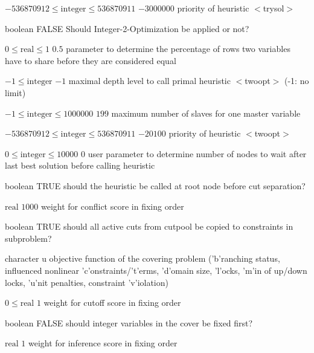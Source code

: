 %
{$-536870912\leq\textrm{integer}\leq536870911$}%
{$-3000000$}%
{priority of heuristic $<$trysol$>$}%
{}

%
{boolean}%
{FALSE}%
{ Should Integer-2-Optimization be applied or not?}%
{}

%
{$0\leq\textrm{real}\leq1$}%
{$0.5$}%
{parameter to determine the percentage of rows two variables have to share before they are considered equal}%
{}

%
{$-1\leq\textrm{integer}$}%
{$-1$}%
{maximal depth level to call primal heuristic $<$twoopt$>$ (-1: no limit)}%
{}

%
{$-1\leq\textrm{integer}\leq1000000$}%
{$199$}%
{maximum number of slaves for one master variable}%
{}

%
{$-536870912\leq\textrm{integer}\leq536870911$}%
{$-20100$}%
{priority of heuristic $<$twoopt$>$}%
{}

%
{$0\leq\textrm{integer}\leq10000$}%
{$0$}%
{user parameter to determine number of nodes to wait after last best solution before calling heuristic}%
{}

%
{boolean}%
{TRUE}%
{should the heuristic be called at root node before cut separation?}%
{}

%
{$\textrm{real}$}%
{$1000$}%
{weight for conflict score in fixing order}%
{}

%
{boolean}%
{TRUE}%
{should all active cuts from cutpool be copied to constraints in subproblem?}%
{}

%
{character}%
{u}%
{objective function of the covering problem ('b'ranching status, influenced nonlinear 'c'onstraints/'t'erms, 'd'omain size, 'l'ocks, 'm'in of up/down locks, 'u'nit penalties, constraint 'v'iolation)}%
{}

%
{$0\leq\textrm{real}$}%
{$1$}%
{weight for cutoff score in fixing order}%
{}

%
{boolean}%
{FALSE}%
{should integer variables in the cover be fixed first?}%
{}

%
{$\textrm{real}$}%
{$1$}%
{weight for inference score in fixing order}%
{}

